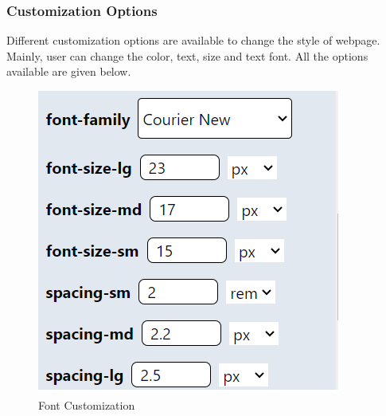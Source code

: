 \documentclass{ioereport}
\begin{document}
\subsubsection{Customization Options}
Different customization options are available to change the style of webpage. Mainly, user can change the color, text,  
size and text font.  All the options available are given below.

\begin{figure}[H]
    \centering
    \begin{minipage}{0.5\textwidth} %
        \centering
        \vspace{+64pt}
        \includegraphics[width=\linewidth]{images/customization 1.png}
        \caption{Font Customization}
        \label{fig:c1}
    \end{minipage}%
    \hfill
    \begin{minipage}{0.5\textwidth}
        \centering

\end{minipage}
\end{figure}
\end{document}
